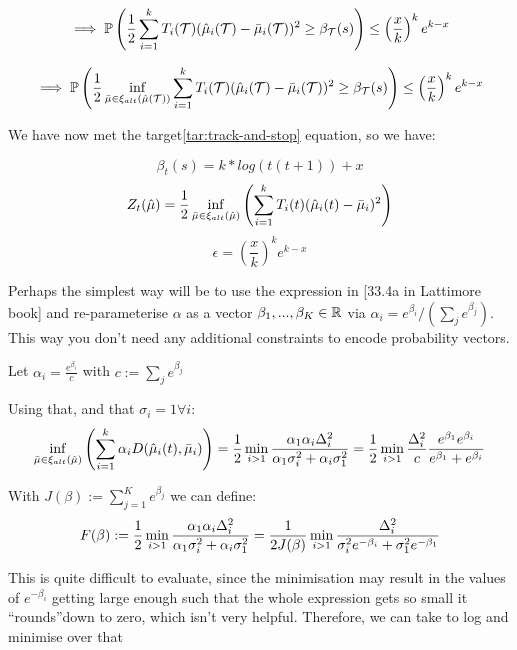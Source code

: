 $$\implies \mathbb{P} \left(\frac{1}{2}\sum_{i=1}^{k} T_i(\mathcal{T})(\hat{\mu}_{i}(\mathcal{T}) - \bar{\mu}_{i}(\mathcal{T}))^2 \geq \beta_{\mathcal{T}}(s) \right) \leq \left(\frac{x}{k}\right)^k e^{k-x}$$

$$\implies \mathbb{P} \left(\frac{1}{2}\inf\limits_{\bar{\mu} \in \xi_{alt}(\hat{\mu}(\mathcal{T}))}\sum_{i=1}^{k} T_i(\mathcal{T})(\hat{\mu}_{i}(\mathcal{T}) - \bar{\mu}_{i}(\mathcal{T}))^2 \geq \beta_{\mathcal{T}}(s) \right) \leq \left(\frac{x}{k}\right)^k e^{k-x}$$

We have now met the target\ref{tar:track-and-stop} equation, so we have:

$$\beta_{t}(s) = k * log\left(t(t+1)\right) + x$$
$$Z_{t}(\hat{\mu}) = \frac{1}{2}\inf\limits_{\bar{\mu} \in \xi_{alt}(\hat{\mu})}\left(\sum_{i=1}^{k} T_i(t)(\hat{\mu}_{i}(t) - \bar{\mu}_{i})^2\right)$$
$$\epsilon = \left(\frac{x}{k}\right)^k e^{k-x}$$

Perhaps the simplest way will be to use the expression in [33.4a in Lattimore book] and re-parameterise $\alpha$ as a vector $\beta_1,...,\beta_K \in \mathbb{R} $ via $ \alpha_i = e^{\beta_i}/(\sum_j e^{\beta_j})$. This way you don't need any additional constraints to encode probability vectors.


Let $\alpha_i = \frac{e^{\beta_i}}{c}$ with $c := \sum_j e^{\beta_j}$

Using that, and that $\sigma_i = 1 \forall i$:
$$\inf\limits_{\bar{\mu} \in \xi_{alt}(\hat{\mu})}\left(\sum_{i=1}^{k} \alpha_i D(\hat{\mu}_{i}(t), \bar{\mu}_{i})\right) = \frac{1}{2}\min_{i>1}\frac{\alpha_1 \alpha_i \Delta_{i}^2}{\alpha_1 \sigma_i^2 + \alpha_i \sigma_1^2} = \frac{1}{2}\min_{i>1}\frac{\Delta_{i}^2}{c} \frac{e^{\beta_1} e^{\beta_i}}{e^{\beta_1} + e^{\beta_i}}
$$

With $J(\beta):=\sum_{j=1}^K e^{\beta_j}$ we can define:
\[F(\beta):= \frac{1}{2}\min_{i>1}\frac{\alpha_1 \alpha_i \Delta_{i}^2}{\alpha_1 \sigma_i^2 + \alpha_i \sigma_1^2}=\frac{1}{2J(\beta)}\min_{i>1}   \frac{\Delta_i^2}{\sigma_i^2e^{-\beta_i} +\sigma_1^2 e^{-\beta_1} }\]

This is quite difficult to evaluate, since the minimisation may result in the values of $e^{-\beta_i}$ getting large enough such that the whole expression gets so small it \textquotedblleft rounds\textquotedblright\space down to zero, which isn't very helpful. Therefore, we can take to log and minimise over that

